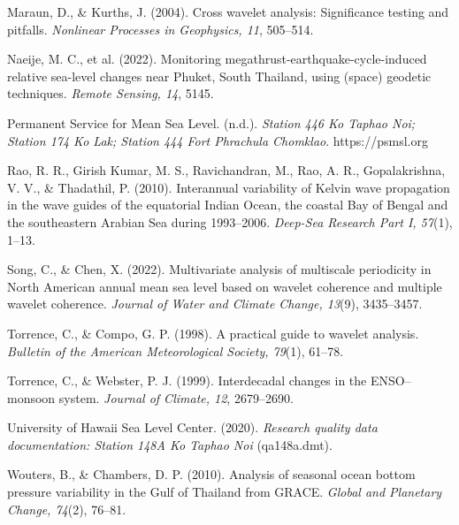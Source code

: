 \documentclass[a4paper,11pt]{article}
\begin{document}
Maraun, D., \& Kurths, J. (2004). Cross wavelet analysis: Significance testing and pitfalls.
\textit{Nonlinear Processes in Geophysics, 11}, 505–514.

Naeije, M. C., et al. (2022). Monitoring megathrust-earthquake-cycle-induced relative sea-level changes near Phuket,
South Thailand, using (space) geodetic techniques. \textit{Remote Sensing, 14}, 5145.

Permanent Service for Mean Sea Level. (n.d.). \textit{Station 446 Ko Taphao Noi; Station 174 Ko Lak; Station 444 Fort
Phrachula Chomklao}. https://psmsl.org

Rao, R. R., Girish Kumar, M. S., Ravichandran, M., Rao, A. R., Gopalakrishna, V. V., \& Thadathil, P. (2010). Interannual
variability of Kelvin wave propagation in the wave guides of the equatorial Indian Ocean, the coastal Bay of Bengal and the
southeastern Arabian Sea during 1993–2006. \textit{Deep-Sea Research Part I, 57}(1), 1–13.

Song, C., \& Chen, X. (2022). Multivariate analysis of multiscale periodicity in North American annual mean sea level based on
wavelet coherence and multiple wavelet coherence. \textit{Journal of Water and Climate Change, 13}(9), 3435–3457.

Torrence, C., \& Compo, G. P. (1998). A practical guide to wavelet analysis.
\textit{Bulletin of the American Meteorological Society, 79}(1), 61–78.

Torrence, C., \& Webster, P. J. (1999). Interdecadal changes in the ENSO–monsoon system. \textit{Journal of Climate, 12}, 2679–2690.

University of Hawaii Sea Level Center. (2020). \textit{Research quality data documentation: Station 148A Ko Taphao Noi} (qa148a.dmt).

Wouters, B., \& Chambers, D. P. (2010). Analysis of seasonal ocean bottom pressure variability in the Gulf of Thailand from
GRACE. \textit{Global and Planetary Change, 74}(2), 76–81.

\endgroup
\end{document}
